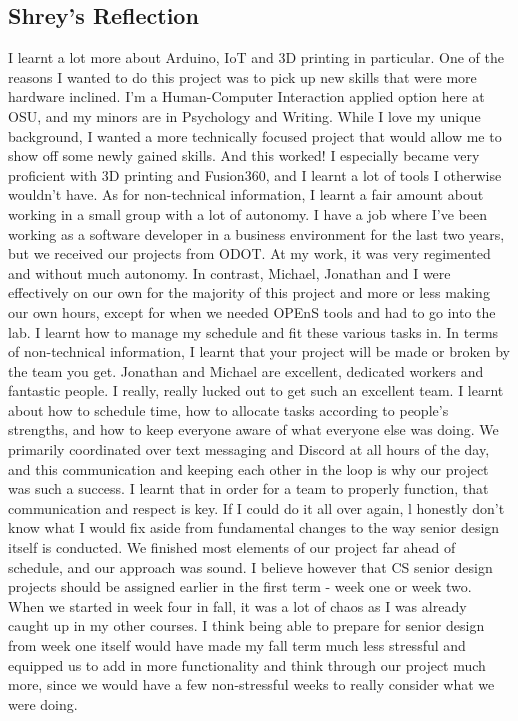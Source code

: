 \documentclass[letterpaper,10pt,draftclsnofoot,onecolumn]{article}
\begin{document}
\subsection{Shrey's Reflection}
I learnt a lot more about Arduino, IoT and 3D printing in particular. One of the reasons I wanted to do this project was to pick up new skills that were more hardware inclined. I’m a Human-Computer Interaction applied option here at OSU, and my minors are in Psychology and Writing. While I love my unique background, I wanted a more technically focused project that would allow me to show off some newly gained skills. And this worked! I especially became very proficient with 3D printing and Fusion360, and I learnt a lot of tools I otherwise wouldn’t have. As for non-technical information, I learnt a fair amount about working in a small group with a lot of autonomy. I have a job where I’ve been working as a software developer in a business environment for the last two years, but we received our projects from ODOT. At my work, it was very regimented and without much autonomy. In contrast, Michael, Jonathan and I were effectively on our own for the majority of this project and more or less making our own hours, except for when we needed OPEnS tools and had to go into the lab. I learnt how to manage my schedule and fit these various tasks in.
\newline
\newline
In terms of non-technical information, I learnt that your project will be made or broken by the team you get. Jonathan and Michael are excellent, dedicated workers and fantastic people. I really, really lucked out to get such an excellent team. I learnt about how to schedule time, how to allocate tasks according to people’s strengths, and how to keep everyone aware of what everyone else was doing. We primarily coordinated over text messaging and Discord at all hours of the day, and this communication and keeping each other in the loop is why our project was such a success. I learnt that in order for a team to properly function, that communication and respect is key.
\newline
\newline
If I could do it all over again, l honestly don’t know what I would fix aside from fundamental changes to the way senior design itself is conducted. We finished most elements of our project far ahead of schedule, and our approach was sound. I believe however that CS senior design projects should be assigned earlier in the first term - week one or week two. When we started in week four in fall, it was a lot of chaos as I was already caught up in my other courses. I think being able to prepare for senior design from week one itself would have made my fall term much less stressful and equipped us to add in more functionality and think through our project much more, since we would have a few non-stressful weeks to really consider what we were doing.
\end{document}
